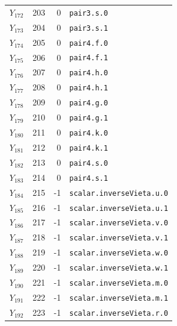 {\begin{longtable}{@{}r r r p{0.64\linewidth}@{}}
\(Y_{172}\) & 203 & 0 & \texttt{pair3.\allowbreak{}s.\allowbreak{}0} \\
\(Y_{173}\) & 204 & 0 & \texttt{pair3.\allowbreak{}s.\allowbreak{}1} \\
\(Y_{174}\) & 205 & 0 & \texttt{pair4.\allowbreak{}f.\allowbreak{}0} \\
\(Y_{175}\) & 206 & 0 & \texttt{pair4.\allowbreak{}f.\allowbreak{}1} \\
\(Y_{176}\) & 207 & 0 & \texttt{pair4.\allowbreak{}h.\allowbreak{}0} \\
\(Y_{177}\) & 208 & 0 & \texttt{pair4.\allowbreak{}h.\allowbreak{}1} \\
\(Y_{178}\) & 209 & 0 & \texttt{pair4.\allowbreak{}g.\allowbreak{}0} \\
\(Y_{179}\) & 210 & 0 & \texttt{pair4.\allowbreak{}g.\allowbreak{}1} \\
\(Y_{180}\) & 211 & 0 & \texttt{pair4.\allowbreak{}k.\allowbreak{}0} \\
\(Y_{181}\) & 212 & 0 & \texttt{pair4.\allowbreak{}k.\allowbreak{}1} \\
\(Y_{182}\) & 213 & 0 & \texttt{pair4.\allowbreak{}s.\allowbreak{}0} \\
\(Y_{183}\) & 214 & 0 & \texttt{pair4.\allowbreak{}s.\allowbreak{}1} \\
\(Y_{184}\) & 215 & -1 & \texttt{scalar.\allowbreak{}inverseVieta.\allowbreak{}u.\allowbreak{}0} \\
\(Y_{185}\) & 216 & -1 & \texttt{scalar.\allowbreak{}inverseVieta.\allowbreak{}u.\allowbreak{}1} \\
\(Y_{186}\) & 217 & -1 & \texttt{scalar.\allowbreak{}inverseVieta.\allowbreak{}v.\allowbreak{}0} \\
\(Y_{187}\) & 218 & -1 & \texttt{scalar.\allowbreak{}inverseVieta.\allowbreak{}v.\allowbreak{}1} \\
\(Y_{188}\) & 219 & -1 & \texttt{scalar.\allowbreak{}inverseVieta.\allowbreak{}w.\allowbreak{}0} \\
\(Y_{189}\) & 220 & -1 & \texttt{scalar.\allowbreak{}inverseVieta.\allowbreak{}w.\allowbreak{}1} \\
\(Y_{190}\) & 221 & -1 & \texttt{scalar.\allowbreak{}inverseVieta.\allowbreak{}m.\allowbreak{}0} \\
\(Y_{191}\) & 222 & -1 & \texttt{scalar.\allowbreak{}inverseVieta.\allowbreak{}m.\allowbreak{}1} \\
\(Y_{192}\) & 223 & -1 & \texttt{scalar.\allowbreak{}inverseVieta.\allowbreak{}r.\allowbreak{}0} \\

\end{longtable}}
